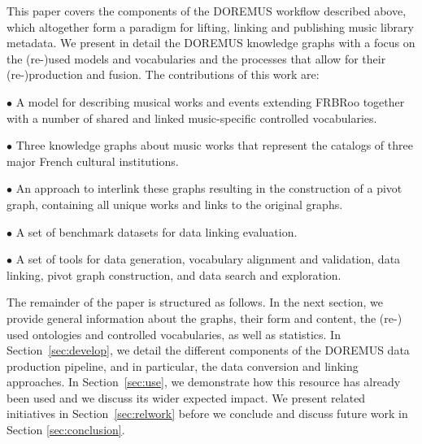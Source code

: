 This paper covers the components of the DOREMUS workflow described above, which altogether form a paradigm for lifting, linking and publishing music library metadata. We present in detail the DOREMUS knowledge graphs with a focus on the (re-)used models and vocabularies and the processes that allow for their (re-)production and fusion. The contributions of this work are:

$\bullet$ A model for describing musical works and events extending FRBRoo together with a number of shared and linked music-specific controlled vocabularies.

$\bullet$ Three knowledge graphs about music works that represent the catalogs of three major French cultural institutions.

$\bullet$ An approach to interlink these graphs resulting in the construction of a pivot graph, containing all unique works and links to the original graphs. 

$\bullet$ A set of benchmark datasets for data linking evaluation.

$\bullet$ A set of tools for data generation, vocabulary alignment and validation, data linking, pivot graph construction, and data search and exploration.

The remainder of the paper is structured as follows. In the next section, we provide general information about the graphs, their form and content, the (re-) used ontologies and controlled vocabularies, as well as statistics. In Section~\ref{sec:develop}, we detail the different components of the DOREMUS data production pipeline, and in particular, the data conversion and linking approaches. In Section~\ref{sec:use}, we demonstrate how this resource has already been used and we discuss its wider expected impact. We present related initiatives in Section~\ref{sec:relwork} before we conclude and discuss future work in Section \ref{sec:conclusion}.